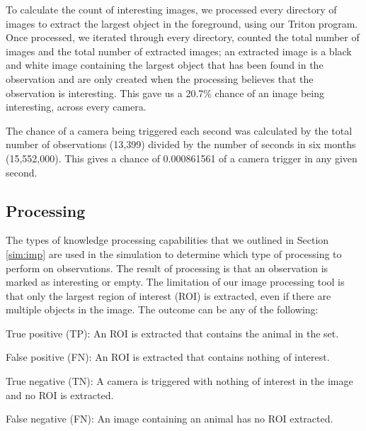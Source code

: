 	To calculate the count of interesting images, we processed every directory of images to extract the largest object in the foreground, using our Triton program. Once processed, we iterated through every directory, counted the total number of images and the total number of extracted images; an extracted image is a black and white image containing the largest object that has been found in the observation and are only created when the processing believes that the observation is interesting. This gave us a 20.7\% chance of an image being interesting, across every camera.
	
	The chance of a camera being triggered each second was calculated by the total number of observations (13,399) divided by the number of seconds in six months (15,552,000). This gives a chance of 0.000861561 of a camera trigger in any given second.
	
\subsection{Processing}
	The types of knowledge processing capabilities that we outlined in Section \ref{sim:imp} are used in the simulation to determine which type of processing to perform on observations. The result of processing is that an observation is marked as interesting or empty. The limitation of our image processing tool is that only the largest region of interest (ROI) is extracted, even if there are multiple objects in the image. The outcome can be any of the following:
		\begin{description}
			\item True positive (TP): An ROI is extracted that contains the animal in the set.
			\item False positive (FN): An ROI is extracted that contains nothing of interest.
			\item True negative (TN): A camera is triggered with nothing of interest in the image and no ROI is extracted.
			\item False negative (FN): An image containing an animal has no ROI extracted.
		\end{description}
	
